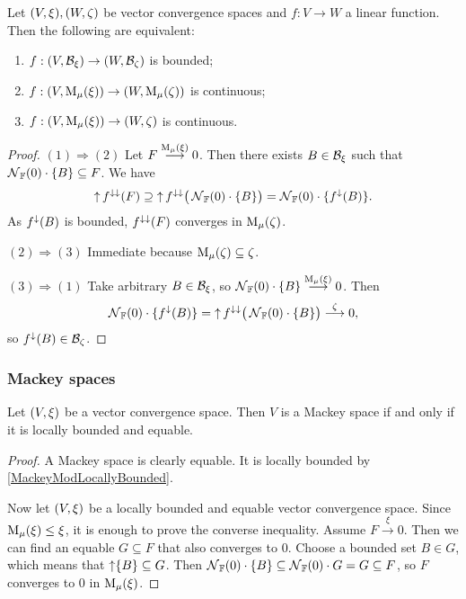 \begin{proposition}
Let $\sSet{V,\xi}, \sSet{W,\zeta}$ be vector convergence spaces and $f:V\to W$ a linear function. Then the following are equivalent:
\begin{enumerate}
\item $f: \sSet{V,\vNborn{\xi}}\to \sSet{W,\vNborn{\zeta}}$ is bounded;
\item $f: \sSet{V,\mackeyMod(\xi)}\to \sSet{W,\mackeyMod(\zeta)}$ is continuous;
\item $f: \sSet{V,\mackeyMod(\xi)}\to \sSet{W,\zeta}$ is continuous.
\end{enumerate}
\end{proposition}
\begin{proof}
$(1) \Rightarrow (2)$ Let $F\overset{\operatorname{M_\mu}(\xi)}{\longrightarrow} 0$. Then there exists $B\in \mathcal{B}_{\xi}$ such that $\operatorname{\mathcal{N}}_{\mathbb{F}}(0)\cdot \{B\} \subseteq F$. We have 
\[ \operatorname{\uparrow} f^{\downarrow\downarrow}(F) \supseteq \operatorname{\uparrow} f^{\downarrow\downarrow}\big(\operatorname{\mathcal{N}}_{\mathbb{F}}(0)\cdot \{B\}\big) = \operatorname{\mathcal{N}}_{\mathbb{F}}(0)\cdot \{f^\downarrow(B)\}. \]
As $f^\downarrow(B)$ is bounded, $f^{\downarrow\downarrow}(F)$ converges in $\operatorname{M_\mu}(\zeta)$.

$(2) \Rightarrow (3)$ Immediate because $\operatorname{M_\mu}(\zeta)\subseteq \zeta$.

$(3) \Rightarrow (1)$ Take arbitrary $B\in \mathcal{B}_{\xi}$, so $\operatorname{\mathcal{N}}_{\mathbb{F}}(0)\cdot \{B\}\overset{\operatorname{M_\mu}(\xi)}{\longrightarrow} 0$. Then
\[ \operatorname{\mathcal{N}}_{\mathbb{F}}(0)\cdot \{f^\downarrow(B)\} = \operatorname{\uparrow} f^{\downarrow\downarrow}\big(\operatorname{\mathcal{N}}_{\mathbb{F}}(0)\cdot \{B\}\big) \overset{\zeta}{\longrightarrow} 0, \]
so $f^\downarrow(B)\in\mathcal{B}_{\zeta}$.
\end{proof}

\subsubsection{Mackey spaces}
\begin{proposition}
Let $\sSet{V,\xi}$ be a vector convergence space. Then $V$ is a Mackey space \textup{if and only if} it is locally bounded and equable.
\end{proposition}
\begin{proof}
A Mackey space is clearly equable. It is locally bounded by \ref{MackeyModLocallyBounded}.

Now let $\sSet{V,\xi}$ be a locally bounded and equable vector convergence space. Since $\operatorname{M_\mu}(\xi)\leq \xi$, it is enough to prove the converse inequality. Assume $F\overset{\xi}{\longrightarrow} 0$. Then we can find an equable $G\subseteq F$ that also converges to $0$. Choose a bounded set $B\in G$, which means that $\operatorname{\uparrow} \{B\}\subseteq G$. Then $\operatorname{\mathcal{N}}_{\mathbb{F}}(0)\cdot \{B\} \subseteq \operatorname{\mathcal{N}}_{\mathbb{F}}(0)\cdot G = G \subseteq F$, so $F$ converges to $0$ in $\operatorname{M_\mu}(\xi)$.
\end{proof}


